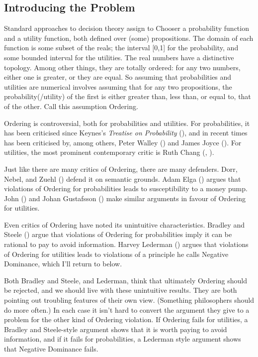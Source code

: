 \documentclass[
  11pt,
  letterpaper,
  DIV=11,
  numbers=noendperiod,
  twoside]{scrartcl}
\begin{document}
\subsection{Introducing the Problem}\label{sec-ordering-intro}

Standard approaches to decision theory assign to Chooser a probability
function and a utility function, both defined over (some) propositions.
The domain of each function is some subset of the reals; the interval
{[}0,1{]} for the probability, and some bounded interval for the
utilities. The real numbers have a distinctive topology. Among other
things, they are totally ordered: for any two numbers, either one is
greater, or they are equal. So assuming that probabilities and utilities
are numerical involves assuming that for any two propositions, the
probability(/utility) of the first is either greater than, less than, or
equal to, that of the other. Call this assumption Ordering.

Ordering is controversial, both for probabilities and utilities. For
probabilities, it has been criticised since Keynes's \emph{Treatise on
Probability} (), and in recent times has
been criticised by, among others, Peter Walley
() and James Joyce
(). For utilities, the most prominent
contemporary critic is Ruth Chang (,
).

Just like there are many critics of Ordering, there are many defenders.
Dorr, Nebel, and Zuehl () defend it on
semantic grounds. Adam Elga () argues that
violations of Ordering for probabilities leads to susceptibility to a
money pump. John () and
Johan Gustafsson () make similar
arguments in favour of Ordering for utilities.

Even critics of Ordering have noted its unintuitive characteristics.
Bradley and Steele () argue that
violations of Ordering for probabilities imply it can be rational to pay
to avoid information. Harvey Lederman ()
argues that violations of Ordering for utilities leads to violations of
a principle he calls Negative Dominance, which I'll return to below.

Both Bradley and Steele, and Lederman, think that ultimately Ordering
should be rejected, and we should live with these unintuitive results.
They are both pointing out troubling features of their own view.
(Something philosophers should do more often.) In each case it isn't
hard to convert the argument they give to a problem for the other kind
of Ordering violation. If Ordering fails for utilities, a Bradley and
Steele-style argument shows that it is worth paying to avoid
information, and if it fails for probabilities, a Lederman style
argument shows that Negative Dominance fails.
\end{document}
